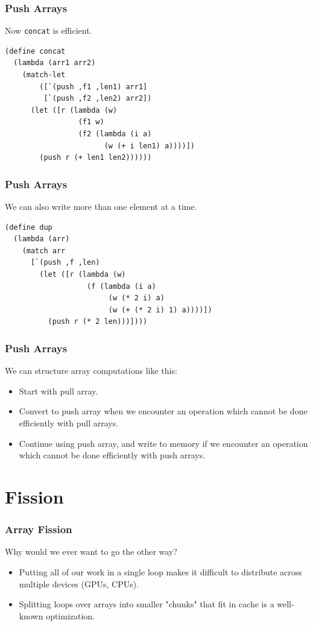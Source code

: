 \documentclass[12pt,letterpaper]{beamer}
\begin{document}
\begin{frame}[fragile]
  \frametitle{Push Arrays}
  Now {\tt concat} is efficient.
  \begin{lstlisting}
(define concat
  (lambda (arr1 arr2)
    (match-let
        ([`(push ,f1 ,len1) arr1]
         [`(push ,f2 ,len2) arr2])
      (let ([r (lambda (w)
                 (f1 w)
                 (f2 (lambda (i a) 
                       (w (+ i len1) a))))])
        (push r (+ len1 len2))))))
  \end{lstlisting}
\end{frame}

\begin{frame}[fragile]
  \frametitle{Push Arrays}
  We can also write more than one element at a time.
  \begin{lstlisting}
(define dup
  (lambda (arr)
    (match arr
      [`(push ,f ,len)
        (let ([r (lambda (w)
                   (f (lambda (i a)
                        (w (* 2 i) a)
                        (w (+ (* 2 i) 1) a))))])
          (push r (* 2 len)))])))  
   \end{lstlisting}
\end{frame}


\begin{frame}
  \frametitle{Push Arrays}
  We can structure array computations like this: \\
  \begin{itemize}
  \item Start with pull array.
  \item Convert to push array when we encounter an operation which cannot be done efficiently with pull arrays.
  \item Continue using push array, and write to memory if we encounter an operation which cannot be done efficiently with push arrays.
  \end{itemize}
\end{frame}
%

\section{Fission}

\begin{frame}
  \frametitle{Array Fission}
  Why would we ever want to go the other way? \\
  \begin{itemize}
  \item Putting all of our work in a single loop makes 
  it difficult to distribute across multiple devices (GPUs,
  CPUs).
  \item Splitting loops over arrays into smaller "chunks" 
  that fit in cache is a well-known optimization.
  \end{itemize}
\end{frame}
\end{document}
